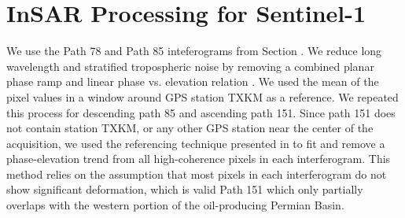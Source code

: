 \section{InSAR Processing for Sentinel-1}

We use the Path 78 and Path 85 inteferograms from Section .
We reduce long wavelength and stratified tropospheric noise by removing a combined planar phase ramp and linear phase vs. elevation relation \cite{Doin2009CorrectionsStratifiedTropospheric, Zebker2021AccuracyModelFree}. We used the mean of the pixel values in a window around GPS station TXKM as a reference.
We repeated this process for descending path 85 and ascending path 151. Since path 151 does not contain station TXKM, or any other GPS station near the center of the acquisition, we used the referencing technique presented in \cite{Zebker2021AccuracyModelFree} to fit and remove a phase-elevation trend from all high-coherence pixels in each interferogram. This method relies on the assumption that most pixels in each interferogram do not show significant deformation, which is valid Path 151 which only partially overlaps with the western portion of the oil-producing Permian Basin. 


